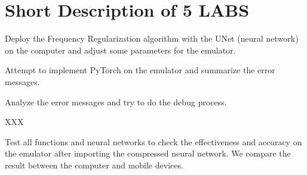 \documentclass{article}
\begin{document}
\section*{Short Description of 5 LABS}

Deploy the Frequency Regularization algorithm with the UNet (neural network) on the computer and adjust some parameters for the emulator. 

Attempt to implement PyTorch on the emulator and summarize the error messages. 

Analyze the error messages and try to do the debug process. 

XXX

Test all functions and neural networks to check the effectiveness and accuracy on the emulator after importing the compressed neural network. We compare the result between the computer and mobile devices. 



\small

% 
  
\end{document}
